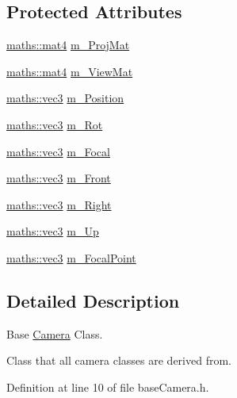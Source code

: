 \subsection*{Protected Attributes}
\begin{DoxyCompactItemize}
\item 
\hyperlink{structspork_1_1maths_1_1mat4}{maths\+::mat4} \hyperlink{classspork_1_1graphics_1_1_camera_ae9845b2898904778df3a6c26e354ee9b}{m\+\_\+\+Proj\+Mat}
\item 
\hyperlink{structspork_1_1maths_1_1mat4}{maths\+::mat4} \hyperlink{classspork_1_1graphics_1_1_camera_a0a91145642b7dac5bafee0c983c6b4a9}{m\+\_\+\+View\+Mat}
\item 
\hyperlink{structspork_1_1maths_1_1vec3}{maths\+::vec3} \hyperlink{classspork_1_1graphics_1_1_camera_ad4247f2c72af3ccd85cb7c05b76d7237}{m\+\_\+\+Position}
\item 
\hyperlink{structspork_1_1maths_1_1vec3}{maths\+::vec3} \hyperlink{classspork_1_1graphics_1_1_camera_a488e7379d52ac5ad3732e7532c9e890c}{m\+\_\+\+Rot}
\item 
\hyperlink{structspork_1_1maths_1_1vec3}{maths\+::vec3} \hyperlink{classspork_1_1graphics_1_1_camera_a24198bdbc3219e9a0da4f718faf5c7bd}{m\+\_\+\+Focal}
\item 
\hyperlink{structspork_1_1maths_1_1vec3}{maths\+::vec3} \hyperlink{classspork_1_1graphics_1_1_camera_a727e302756442d2c1c47cca329279c00}{m\+\_\+\+Front}
\item 
\hyperlink{structspork_1_1maths_1_1vec3}{maths\+::vec3} \hyperlink{classspork_1_1graphics_1_1_camera_aef28f427afba06666beb38ab9c3485df}{m\+\_\+\+Right}
\item 
\hyperlink{structspork_1_1maths_1_1vec3}{maths\+::vec3} \hyperlink{classspork_1_1graphics_1_1_camera_abfffa649cf3def026da9643d2d1debe0}{m\+\_\+\+Up}
\item 
\hyperlink{structspork_1_1maths_1_1vec3}{maths\+::vec3} \hyperlink{classspork_1_1graphics_1_1_camera_a88aabacaa44ca722d257bd8b1b7e8411}{m\+\_\+\+Focal\+Point}
\end{DoxyCompactItemize}


\subsection{Detailed Description}
Base \hyperlink{classspork_1_1graphics_1_1_camera}{Camera} Class. 

Class that all camera classes are derived from. 

Definition at line 10 of file base\+Camera.\+h.



